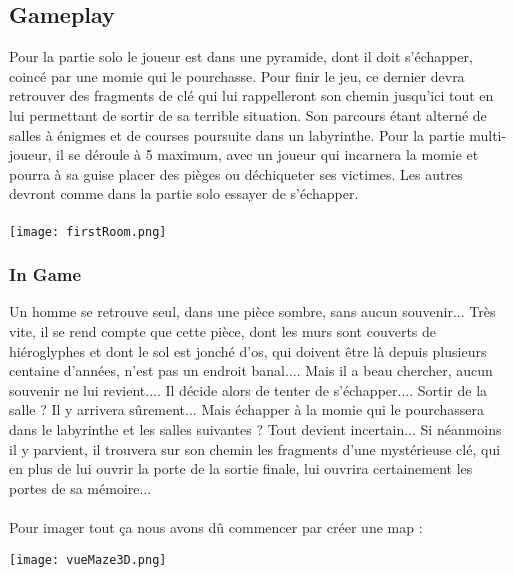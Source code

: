 \documentclass[12pt,a4paper]{article}
\begin{document}
\subsection{Gameplay}
Pour la partie solo le joueur est dans une pyramide, dont il doit s'échapper, coincé par une momie qui le pourchasse. Pour finir le jeu, ce dernier devra retrouver des fragments de clé qui lui rappelleront son chemin jusqu'ici tout en lui permettant de sortir de sa terrible situation. Son parcours étant alterné de salles à énigmes et de courses poursuite dans un labyrinthe.
Pour la partie multi-joueur, il se déroule à 5 maximum, avec un joueur qui incarnera la momie et pourra à sa guise placer des pièges ou déchiqueter ses victimes.
Les autres devront comme dans la partie solo essayer de s'échapper.
\paragraph{}
\texttt{[image: firstRoom.png]}
\newpage
\subsubsection{In Game}
Un homme se retrouve seul, dans une pièce sombre, sans aucun souvenir...
Très vite, il se rend compte que cette pièce, dont les murs sont couverts de hiéroglyphes et dont le sol est jonché d'os, qui doivent être là depuis plusieurs centaine d'années, n'est pas un endroit banal....
Mais il a beau chercher, aucun souvenir ne lui revient....
Il décide alors de tenter de s'échapper....
Sortir de la salle ? Il y arrivera sûrement... Mais échapper à la momie qui le pourchassera dans le labyrinthe et les salles suivantes ? Tout devient incertain...
Si néanmoins il y parvient, il trouvera sur son chemin les fragments d'une mystérieuse clé, qui en plus de lui ouvrir la porte de la sortie finale, lui ouvrira certainement les portes de sa mémoire...
\paragraph{}
Pour imager tout ça nous avons dû commencer par créer une map :
\begin{center}
\texttt{[image: vueMaze3D.png]}
\end{center}
\end{document}
